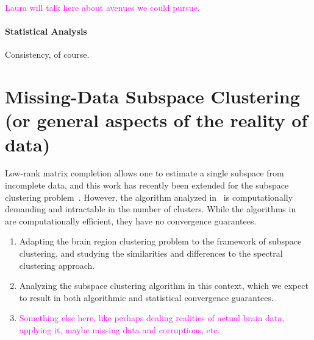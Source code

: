 \documentclass[times,11pt]{article} %
\newcommand{\laura}{\textcolor{magenta}}
\begin{document}
\laura{Laura will talk here about avenues we could pursue. }

\paragraph{Statistical Analysis} Consistency, of course.



\section{Missing-Data Subspace Clustering (or general aspects of the reality of data)}


Low-rank matrix completion allows one to estimate a single subspace from incomplete data, and this work has recently been extended for the subspace clustering problem~\cite{hrmc, balzano2012ssp, pimentel2014}. However, the algorithm analyzed in~\cite{hrmc} is computationally demanding and intractable in the number of clusters. While the algorithms in~\cite{balzano2012ssp, pimentel2014} are computationally efficient, they have no convergence guarantees. 




\begin{enumerate}
\item Adapting the brain region clustering problem to the framework of subspace clustering, and studying the similarities and differences to the spectral clustering approach.
\item Analyzing the subspace clustering algorithm in this context, which we expect to result in both algorithmic and statistical convergence guarantees.
\item \laura{Something else here, like perhaps dealing realities of actual brain data, applying it, maybe missing data and corruptions, etc.}
\end{enumerate}
\end{document}
